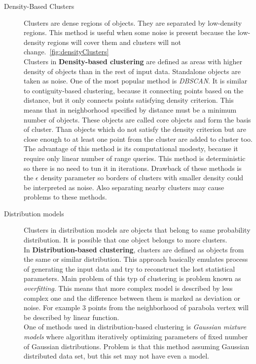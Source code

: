 \begin{description}
\item[Density-Based Clusters] Clusters are dense regions of objects. They are separated by low-density regions. This method is useful when some noise is present because the low-density regions will cover them and clusters will not change.~\autoref{fig:densityClusters} \\
Clusters in \textbf{Density-based clustering} are defined as areas with higher density of objects than in the rest of input data. Standalone objects are taken as noise. One of the most popular method is \textit{DBSCAN}. It is similar to contiguity-based clustering, because it connecting points based on the distance, but it only connects points satisfying density criterion. This means that in neighborhood specified by distance must be a minimum number of objects. These objects are called core objects and form the basis of cluster. Than objects which do not satisfy the density criterion but are close enough to at least one point from the cluster are added to cluster too.\\
The advantage of this method is its computational modesty, because it require only linear number of range queries. This method is deterministic so there is no need to tun it in iterations.
Drawback of these methods is the $\epsilon$ density parameter so borders of clusters with smaller density could be interpreted as  noise. Also separating nearby clusters may cause problems to these methods.

\item[Distribution models] Clusters in distribution models are objects that belong to same probability distribution. It is possible that one object belongs to more clusters.\\
In \textbf{Distribution-based clustering}, clusters are defined as objects from the same or similar distribution. This approach basically emulates process of generating the input data and try to reconstruct the lost statistical parameters. Main problem of this typ of clustering is problem known as \textit{overfitting}. This means that more complex model is described by less complex one and the difference between them is marked as deviation or noise. For example 3 points from the neighborhood of parabola vertex will be described by linear function.\\
One of methods used in distribution-based clustering is \textit{Gaussian mixture models} where algorithm iteratively optimizing parameters of fixed number of Gaussian distributions.
Problem is that this method assuming Gaussian distributed data set, but this set may not have even a model.


\end{description}
